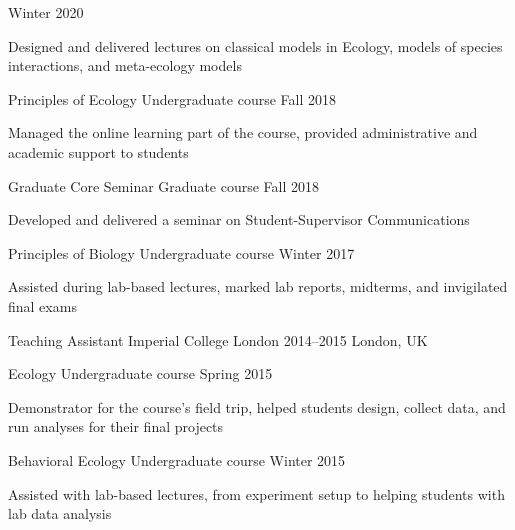 \begin{cventries}
{\begin{cvsubentries}
         {Winter 2020}
         {
         \begin{cvitems}
          \item Designed and delivered lectures on classical models in Ecology, models of species interactions, and meta-ecology models
         \end{cvitems} 
         }
       \cvsubentry
         {Principles of Ecology}
         {\footnotesize Undergraduate course}
         {Fall 2018}
         {
         \begin{cvitems}
          \item Managed the online learning part of the course, provided administrative and academic support to students
         \end{cvitems} 
         }
       \cvsubentry
         {Graduate Core Seminar}
         {\footnotesize Graduate course}
         {Fall 2018}
         {
         \begin{cvitems}
          \item Developed and delivered a seminar on Student-Supervisor Communications
         \end{cvitems} 
         }  
       \cvsubentry
         {Principles of Biology}
         {\footnotesize Undergraduate course}
         {Winter 2017}
         {
         \begin{cvitems}
          \item Assisted during lab-based lectures, marked lab reports, midterms, and invigilated final exams
         \end{cvitems} 
         }
      \end{cvsubentries}
    }
 \cventry
    {Teaching Assistant} %
    {Imperial College London} %
    {2014--2015} %
    {London, UK} %
    {
      \begin{cvsubentries}
       \cvsubentry
         {Ecology}
         {\footnotesize Undergraduate course}
         {Spring 2015}
         {
         \begin{cvitems}
          \item Demonstrator for the course's field trip, helped students design, collect data, and run analyses for their final projects
         \end{cvitems} 
         }
       \cvsubentry
         {Behavioral Ecology}
         {\footnotesize Undergraduate course}
         {Winter 2015}
         {
         \begin{cvitems}
          \item Assisted with lab-based lectures, from experiment setup to helping students with lab data analysis

\end{cvitems}}
\end{cvsubentries}}
\end{cventries}
